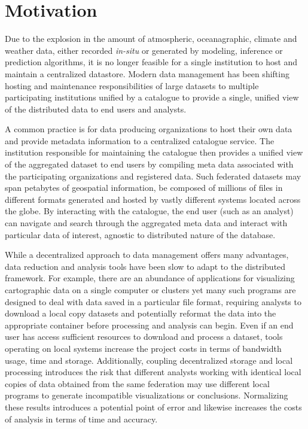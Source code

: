 \section{Motivation}
\label{sec:motivation}
Due to the explosion in the amount of atmospheric, oceanagraphic,
climate and weather data, either recorded \emph{in-situ} or generated
by modeling, inference or prediction algorithms, it is no longer
feasible for a single institution to host and maintain a centralized
datastore. Modern data management has been shifting hosting and
maintenance responsibilities of large datasets to multiple
participating institutions unified by a catalogue to provide a
single, unified view of the distributed data to end users and
analysts.

A common practice is for data producing organizations to host their
own data and provide metadata information to a centralized catalogue
service. The institution responsible for maintaining the catalogue
then provides a unified view of the aggregated dataset to end users by
compiling meta data associated with the participating organizations
and registered data. Such federated datasets may span petabytes of
geospatial information, be composed of millions of files in different
formats generated and hosted by vastly different systems located
across the globe. By interacting with the catalogue, the end user (such as
an analyst) can navigate and search through the aggregated meta data
and interact with particular data of interest, agnostic to distributed
nature of the database.

While a decentralized approach to data management offers many
advantages, data reduction and analysis tools have been slow to adapt
to the distributed framework. For example, there are an abundance of
applications for visualizing cartographic data on a single computer or
clusters yet many such programs are designed to deal with data saved
in a particular file format, requiring analysts to download a local
copy datasets and potentially reformat the data into the appropriate
container before processing and analysis can begin. Even if an end
user has access sufficient resources to download and process a
dataset, tools operating on local systems increase the project costs
in terms of bandwidth usage, time and storage. Additionally, coupling
decentralized storage and local processing introduces the risk that
different analysts working with identical local copies of data
obtained from the same federation may use different local programs to
generate incompatible visualizations or conclusions. Normalizing these
results introduces a potential point of error and likewise increases
the costs of analysis in terms of time and accuracy. 

